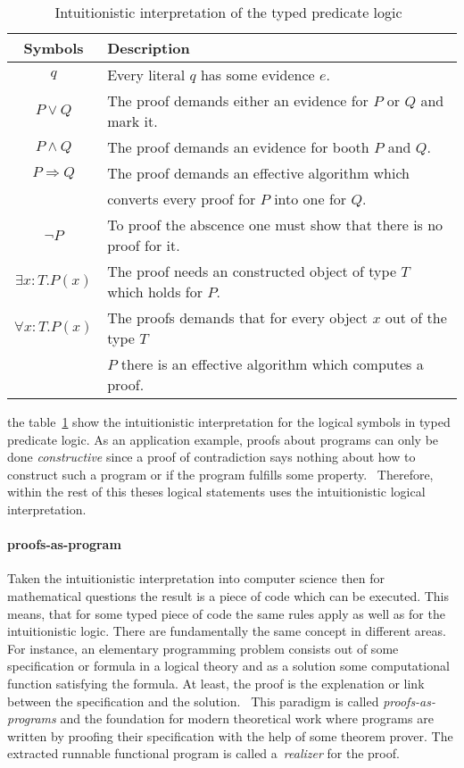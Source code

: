 \begin{table}[h]
  \centering
  \begin{tabular}{c|l}
    Symbols &  Description\\\hline
    $q$ & Every literal $q$ has some evidence $e$.\\
    $P\vee Q$ & The proof demands either an evidence for $P$ or $Q$ and mark it.\\
    $P\wedge Q$ & The proof demands an evidence for booth $P$ and $Q$.\\
    $P\Rightarrow Q$ & The proof demands an effective algorithm which\\
           & converts every proof for $P$ into one for $Q$.\\
    $\neg P$ & To proof the abscence one must show that there is no proof for it.\\
    $\exists x:T.P(x)$ & The proof needs an constructed object of type $T$ which holds for $P$.\\
    $\forall x:T.P(x)$ & The proofs demands that for every object $x$ out of the type $T$\\
                 &  $P$ there is an effective algorithm which computes a proof.
  \end{tabular}
  \caption{Intuitionistic interpretation of the typed predicate logic~\cite{sep-mathematics-constructive}}
  \label{tab:intsymbols}
\end{table}

the table~\ref{tab:intsymbols} show the intuitionistic interpretation for the logical
symbols in typed predicate logic. As an application example, proofs about
programs can only be done \textit{constructive} since a proof of contradiction
says nothing about how to construct such a program or if the program
fulfills some property.~\cite{kreitz1994automatisierte}
Therefore, within the rest of this theses logical
statements uses the intuitionistic logical interpretation.

\paragraph{proofs-as-program}
Taken the intuitionistic interpretation into computer science then for
mathematical questions the result is a piece of code which can be
executed. This means, that for some typed piece of code the same
rules apply as well as for the intuitionistic logic. There are
fundamentally the same concept in different areas.
For instance, an elementary programming problem consists out of
some specification or formula in a logical theory and as a solution
some computational function satisfying the formula. At least, the
proof is the explenation or link between the specification and the
solution.~\cite{bates1985proofs}
This paradigm is called \textit{proofs-as-programs} and the foundation
for modern theoretical work where programs are written by proofing their
specification with the help of some theorem prover. The extracted runnable
functional program is called a~\textit{realizer} for the proof.

